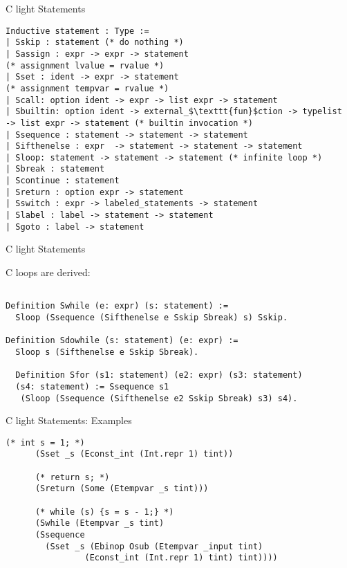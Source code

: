 \documentclass{beamer}
\begin{document}
\begin{frame}[fragile]{C light Statements}

  \begin{lstlisting}[language=Coq]
Inductive statement : Type :=
| Sskip : statement (* do nothing *)
| Sassign : expr -> expr -> statement
(* assignment lvalue = rvalue *)
| Sset : ident -> expr -> statement
(* assignment tempvar = rvalue *)
| Scall: option ident -> expr -> list expr -> statement
| Sbuiltin: option ident -> external_$\texttt{fun}$ction -> typelist
-> list expr -> statement (* builtin invocation *)
| Ssequence : statement -> statement -> statement
| Sifthenelse : expr  -> statement -> statement -> statement
| Sloop: statement -> statement -> statement (* infinite loop *)
| Sbreak : statement
| Scontinue : statement
| Sreturn : option expr -> statement
| Sswitch : expr -> labeled_statements -> statement
| Slabel : label -> statement -> statement
| Sgoto : label -> statement

  \end{lstlisting}
  


\end{frame}



\begin{frame}[fragile]{C light Statements}

  C loops are derived:

  \begin{lstlisting}[language=Coq]
    
Definition Swhile (e: expr) (s: statement) :=
  Sloop (Ssequence (Sifthenelse e Sskip Sbreak) s) Sskip.

Definition Sdowhile (s: statement) (e: expr) :=
  Sloop s (Sifthenelse e Sskip Sbreak).

  Definition Sfor (s1: statement) (e2: expr) (s3: statement)
  (s4: statement) := Ssequence s1
   (Sloop (Ssequence (Sifthenelse e2 Sskip Sbreak) s3) s4).

  \end{lstlisting}
  


\end{frame}


\begin{frame}[fragile]{C light Statements: Examples}

  \begin{lstlisting}[language=Coq]
     (* int s = 1; *)
      (Sset _s (Econst_int (Int.repr 1) tint))

      (* return s; *)
      (Sreturn (Some (Etempvar _s tint)))

      (* while (s) {s = s - 1;} *)
      (Swhile (Etempvar _s tint) 
      (Ssequence  
        (Sset _s (Ebinop Osub (Etempvar _input tint)
                (Econst_int (Int.repr 1) tint) tint))))


  \end{lstlisting}
  


\end{frame}
\end{document}
